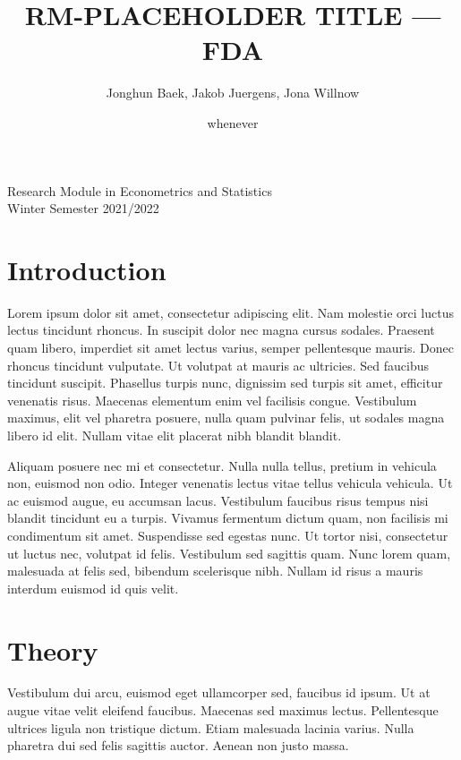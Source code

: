 \documentclass[11pt,twoside,a4paper]{article}
\begin{document}
	\title{{\LARGE RM-PLACEHOLDER TITLE — FDA}}
	\author{Jonghun Baek, Jakob Juergens, Jona Willnow}
	\date{whenever}
	\maketitle
	\vspace{1.5 cm}
	\begin{center}
		Research Module in Econometrics and Statistics \\
		Winter Semester 2021/2022
	\end{center}
	
	\newpage
	
	\tableofcontents
	
	\newpage
	
	\section{Introduction}
	Lorem ipsum dolor sit amet, consectetur adipiscing elit. Nam molestie orci luctus lectus tincidunt rhoncus. In suscipit dolor nec magna cursus sodales. Praesent quam libero, imperdiet sit amet lectus varius, semper pellentesque mauris. Donec rhoncus tincidunt vulputate. Ut volutpat at mauris ac ultricies. Sed faucibus tincidunt suscipit. Phasellus turpis nunc, dignissim sed turpis sit amet, efficitur venenatis risus. Maecenas elementum enim vel facilisis congue. Vestibulum maximus, elit vel pharetra posuere, nulla quam pulvinar felis, ut sodales magna libero id elit. Nullam vitae elit placerat nibh blandit blandit.
	
	Aliquam posuere nec mi et consectetur. Nulla nulla tellus, pretium in vehicula non, euismod non odio. Integer venenatis lectus vitae tellus vehicula vehicula. Ut ac euismod augue, eu accumsan lacus. Vestibulum faucibus risus tempus nisi blandit tincidunt eu a turpis. Vivamus fermentum dictum quam, non facilisis mi condimentum sit amet. Suspendisse sed egestas nunc. Ut tortor nisi, consectetur ut luctus nec, volutpat id felis. Vestibulum sed sagittis quam. Nunc lorem quam, malesuada at felis sed, bibendum scelerisque nibh. Nullam id risus a mauris interdum euismod id quis velit.
	
	\section{Theory}
	Vestibulum dui arcu, euismod eget ullamcorper sed, faucibus id ipsum. Ut at augue vitae velit eleifend faucibus. Maecenas sed maximus lectus. Pellentesque ultrices ligula non tristique dictum. Etiam malesuada lacinia varius. Nulla pharetra dui sed felis sagittis auctor. Aenean non justo massa.
	
\end{document}
